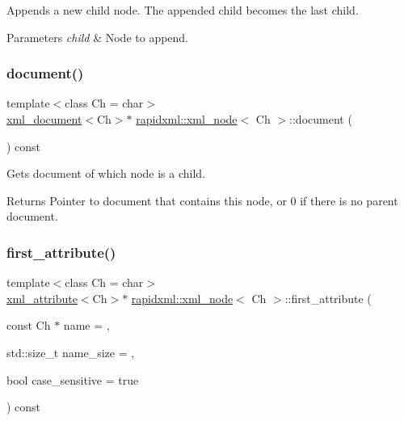 Appends a new child node. The appended child becomes the last child. 
\begin{DoxyParams}{Parameters}
{\em child} & Node to append. \\
\hline
\end{DoxyParams}
\mbox{\label{classrapidxml_1_1xml__node_af23d2d56182411e9261ca6974bfd767f}} 
\subsubsection{\texorpdfstring{document()}{document()}}
{\footnotesize\ttfamily template$<$class Ch = char$>$ \\
\hyperlink{classrapidxml_1_1xml__document}{xml\+\_\+document}$<$Ch$>$$\ast$ \hyperlink{classrapidxml_1_1xml__node}{rapidxml\+::xml\+\_\+node}$<$ Ch $>$\+::document (\begin{DoxyParamCaption}{ }\end{DoxyParamCaption}) const\hspace{0.3cm}{\ttfamily [inline]}}

Gets document of which node is a child. \begin{DoxyReturn}{Returns}
Pointer to document that contains this node, or 0 if there is no parent document. 
\end{DoxyReturn}
\mbox{\label{classrapidxml_1_1xml__node_ab816ab6f13ee4b0588d5b76b0697511c}} 
\subsubsection{\texorpdfstring{first\+\_\+attribute()}{first\_attribute()}}
{\footnotesize\ttfamily template$<$class Ch = char$>$ \\
\hyperlink{classrapidxml_1_1xml__attribute}{xml\+\_\+attribute}$<$Ch$>$$\ast$ \hyperlink{classrapidxml_1_1xml__node}{rapidxml\+::xml\+\_\+node}$<$ Ch $>$\+::first\+\_\+attribute (\begin{DoxyParamCaption}\item[{const Ch $\ast$}]{name = {},  }\item[{std\+::size\+\_\+t}]{name\+\_\+size = {},  }\item[{bool}]{case\+\_\+sensitive = {\ttfamily true} }\end{DoxyParamCaption}) const\hspace{0.3cm}{\ttfamily [inline]}}

